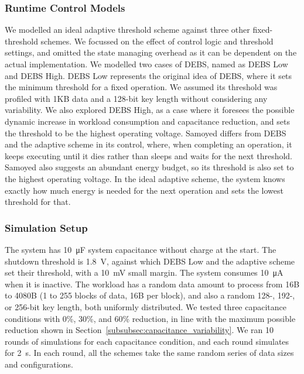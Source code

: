 \subsubsection{Runtime Control Models}

We modelled an ideal adaptive threshold scheme against three other fixed-threshold schemes.
We focussed on the effect of control logic and threshold settings, and omitted the state managing overhead as it can be dependent on the actual implementation. 
We modelled two cases of DEBS, named as DEBS Low and DEBS High.
DEBS Low represents the original idea of DEBS, where it sets the minimum threshold for a fixed operation.  
We assumed its threshold was profiled with 1KB data and a 128-bit key length without considering any variability. 
We also explored DEBS High, as a case where it foresees the possible dynamic increase in workload consumption and capacitance reduction, and sets the threshold to be the highest operating voltage.
Samoyed differs from DEBS and the adaptive scheme in its control, where, when completing an operation, it keeps executing until it dies rather than sleeps and waits for the next threshold.
Samoyed also suggests an abundant energy budget, so its threshold is also set to the highest operating voltage.
In the ideal adaptive scheme, the system knows exactly how much energy is needed for the next operation and sets the lowest threshold for that. 

\subsubsection{Simulation Setup}

The system has \SI{10}{\micro\farad} system capacitance without charge at the start. 
The shutdown threshold is \SI{1.8}{\volt}, against which DEBS Low and the adaptive scheme set their threshold, with a \SI{10}{\milli\volt} small margin. 
The system consumes \SI{10}{\micro\ampere} when it is inactive.
The workload has a random data amount to process from 16B to 4080B (1 to 255 blocks of data, 16B per block), and also a random 128-, 192-, or 256-bit key length, both uniformly distributed.
We tested three capacitance conditions with 0\%, 30\%, and 60\% reduction, in line with the maximum possible reduction shown in Section~\ref{subsubsec:capacitance_variability}. 
We ran 10 rounds of simulations for each capacitance condition, and each round simulates for \SI{2}{\second}. 
In each round, all the schemes take the same random series of data sizes and configurations.

